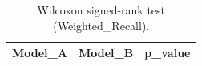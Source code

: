 \begin{table}[t]
\centering
\begin{tabular}{lll}
\toprule
Model_A & Model_B & p_value \\
\midrule
\bottomrule
\end{tabular}
\caption{Wilcoxon signed-rank test (Weighted_Recall).}
\label{tab:wilcoxon_Weighted_Recall}
\end{table}